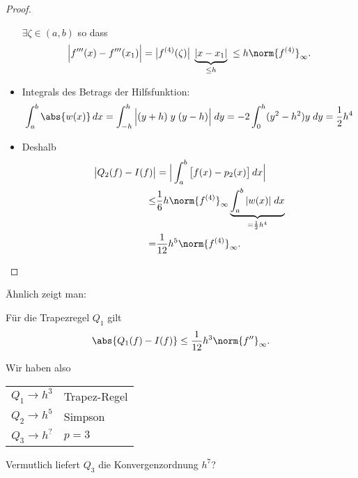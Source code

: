 \begin{proof}
\begin{itemize}
 $\exists \zeta \in (a,b)$ so dass
\begin{equation*}
 \Big\vert f'''(x) - f'''(x_1) \Big \vert
 =
 \big \vert f^{(4)} (\zeta) \big \vert \;\underbrace{\vert x-x_1\vert}_{\le h} \; \le h \norm{f^{(4)}}_\infty.
\end{equation*}
\item Integrals des Betrags der Hilfsfunktion:
\begin{equation*}
 \int_a^b \abs{w(x)}\,dx
 =
 \int_{-h}^h \Big\vert(y+h)\;y \;(y-h)\Big\vert \; dy = -2 \int_0^h (y^2- h^2)y \; dy = \frac{1}{2} h^4
\end{equation*}

\item Deshalb
\begin{align*}
\big \vert Q_2(f) - I(f) \big\vert
 &=
 \Big \vert \int_a^b \big [f(x) - p_2(x) \big] \, dx \Big \vert
\\ \le & \frac{1}{6} h \norm{f^{(4)}}_\infty \underbrace{\int_a^b \vert w(x) \vert \; dx}_{= \frac{1}{2} h^4}
\\ = & \frac{1}{12} h^5 \norm{f^{(4)}}_\infty. \qedhere
\end{align*}
\end{itemize}
\end{proof}

\bigskip

Ähnlich zeigt man:
\begin{lemma}
 Für die Trapezregel $Q_1$ gilt
 \begin{equation*}
  \abs{Q_1(f) - I(f)} \le \frac{1}{12} h^3 \norm{f''}_\infty.
 \end{equation*}
\end{lemma}

Wir haben also

\begin{center}
\begin{tabular}{ c l }
  $Q_1 \rightarrow h^3$ & Trapez-Regel\\
  $Q_2 \rightarrow h^5$ & Simpson \\
  $Q_3 \rightarrow h^?$  & $p=3$ \\
\end{tabular}
\end{center}

Vermutlich liefert $Q_3$ die Konvergenzordnung $h^7$?

